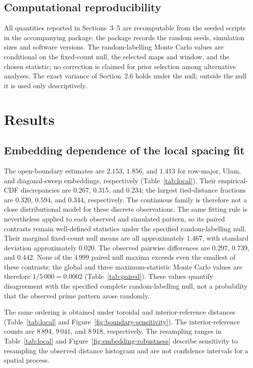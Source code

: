 \documentclass[final,1p,times,authoryear]{elsarticle}
\theoremstyle{definition}
\begin{document}
\subsection{Computational reproducibility}

All quantities reported in Sections~3--5 are recomputable from the seeded
scripts in the accompanying package; the package records the random seeds,
simulation sizes and software versions. The random-labelling Monte Carlo
values are conditional on the fixed-count null, the selected maps and window,
and the chosen statistic; no correction is claimed for prior selection among
alternative analyses. The exact variance of Section~2.6 holds under the null;
outside the null it is used only descriptively.

\section{Results}

\subsection{Embedding dependence of the local spacing fit}

The open-boundary estimates are $2.153$, $1.856$, and $1.413$ for row-major,
Ulam, and diagonal-sweep embeddings, respectively (Table~\ref{tab:local}).
Their empirical-CDF discrepancies are $0.267$, $0.315$, and $0.234$; the
largest tied-distance fractions are $0.320$, $0.594$, and $0.344$,
respectively. The continuous family is therefore not a close distributional
model for these discrete observations. The same fitting rule is nevertheless
applied to each observed and simulated pattern, so its paired contrasts remain
well-defined statistics under the specified random-labelling null.
Their marginal fixed-count null means are all approximately $1.467$, with
standard deviation approximately $0.020$. The observed pairwise differences
are $0.297$, $0.739$, and $0.442$. None of the $4\,999$ paired null maxima
exceeds even the smallest of these contrasts; the global and three
maximum-statistic Monte Carlo values are therefore $1/5\,000=0.0002$
(Table~\ref{tab:paired}). These values quantify disagreement with the
specified complete random-labelling null, not a probability that the observed
prime pattern arose randomly.

The same ordering is obtained under toroidal and interior-reference distances
(Table~\ref{tab:local} and Figure~\ref{fig:boundary-sensitivity}). The
interior-reference counts are $8\,894$, $9\,041$, and $8\,918$, respectively.
The resampling ranges in Table~\ref{tab:local} and
Figure~\ref{fig:embedding-robustness} describe sensitivity to resampling the
observed distance histogram and are not confidence intervals for a spatial
process.
\end{document}
